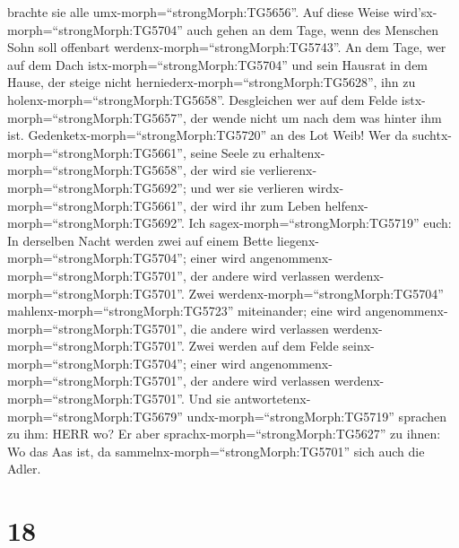 brachte sie alle umx-morph=``strongMorph:TG5656''.  Auf
diese Weise wird'sx-morph=``strongMorph:TG5704'' auch gehen an dem Tage,
wenn des Menschen Sohn soll offenbart
werdenx-morph=``strongMorph:TG5743''.  An dem Tage, wer auf
dem Dach istx-morph=``strongMorph:TG5704'' und sein Hausrat in dem
Hause, der steige nicht herniederx-morph=``strongMorph:TG5628'', ihn zu
holenx-morph=``strongMorph:TG5658''. Desgleichen wer auf dem Felde
istx-morph=``strongMorph:TG5657'', der wende nicht um nach dem was
hinter ihm ist.  Gedenketx-morph=``strongMorph:TG5720'' an
des Lot Weib!  Wer da suchtx-morph=``strongMorph:TG5661'',
seine Seele zu erhaltenx-morph=``strongMorph:TG5658'', der wird sie
verlierenx-morph=``strongMorph:TG5692''; und wer sie verlieren
wirdx-morph=``strongMorph:TG5661'', der wird ihr zum Leben
helfenx-morph=``strongMorph:TG5692''.  Ich
sagex-morph=``strongMorph:TG5719'' euch: In derselben Nacht werden zwei
auf einem Bette liegenx-morph=``strongMorph:TG5704''; einer wird
angenommenx-morph=``strongMorph:TG5701'', der andere wird verlassen
werdenx-morph=``strongMorph:TG5701''.  Zwei
werdenx-morph=``strongMorph:TG5704''
mahlenx-morph=``strongMorph:TG5723'' miteinander; eine wird
angenommenx-morph=``strongMorph:TG5701'', die andere wird verlassen
werdenx-morph=``strongMorph:TG5701''.  Zwei werden auf dem
Felde seinx-morph=``strongMorph:TG5704''; einer wird
angenommenx-morph=``strongMorph:TG5701'', der andere wird verlassen
werdenx-morph=``strongMorph:TG5701''.  Und sie
antwortetenx-morph=``strongMorph:TG5679''
undx-morph=``strongMorph:TG5719'' sprachen zu ihm: HERR wo? Er aber
sprachx-morph=``strongMorph:TG5627'' zu ihnen: Wo das Aas ist, da
sammelnx-morph=``strongMorph:TG5701'' sich auch die Adler.

\hypertarget{section-17}{%
\section{18}\label{section-17}}

